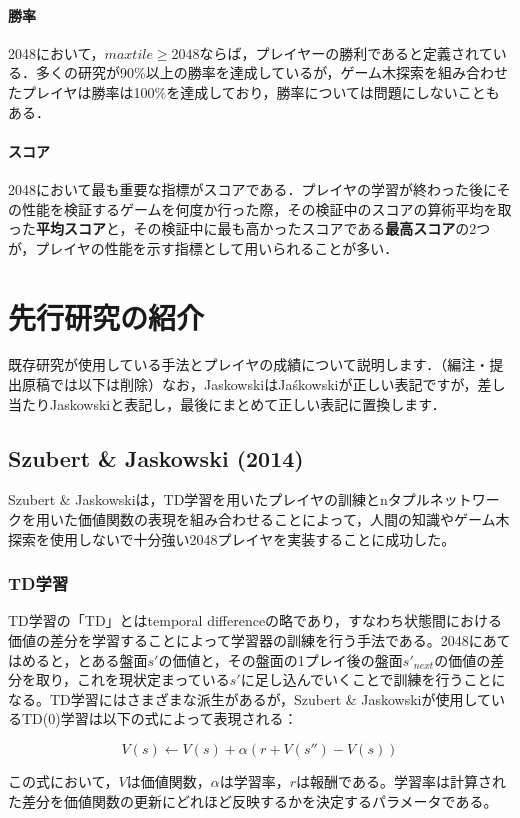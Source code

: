 \documentclass{suribt}
\begin{document}
\subsubsection{勝率}
2048において，$max tile \geq 2048$ならば，プレイヤーの勝利であると定義されている．多くの研究が90\%以上の勝率を達成しているが，ゲーム木探索を組み合わせたプレイヤは勝率は100\%を達成しており，勝率については問題にしないこともある．

\subsubsection{スコア}
2048において最も重要な指標がスコアである．プレイヤの学習が終わった後にその性能を検証するゲームを何度か行った際，その検証中のスコアの算術平均を取った\textbf{平均スコア}と，その検証中に最も高かったスコアである\textbf{最高スコア}の2つが，プレイヤの性能を示す指標として用いられることが多い．

\chapter{先行研究の紹介}
既存研究が使用している手法とプレイヤの成績について説明します．（編注・提出原稿では以下は削除）なお，JaskowskiはJa\'{s}kowskiが正しい表記ですが，差し当たりJaskowskiと表記し，最後にまとめて正しい表記に置換します．

\section{Szubert \& Jaskowski (2014)}
Szubert \& Jaskowskiは，TD学習を用いたプレイヤの訓練とnタプルネットワークを用いた価値関数の表現を組み合わせることによって，人間の知識やゲーム木探索を使用しないで十分強い2048プレイヤを実装することに成功した。
\subsection{TD学習}
TD学習の「TD」とはtemporal differenceの略であり，すなわち状態間における価値の差分を学習することによって学習器の訓練を行う手法である。2048にあてはめると，とある盤面$s'$の価値と，その盤面の1プレイ後の盤面$s'_{next}$の価値の差分を取り，これを現状定まっている$s'$に足し込んでいくことで訓練を行うことになる。TD学習にはさまざまな派生があるが，Szubert \& Jaskowskiが使用しているTD(0)学習は以下の式によって表現される：

\[
	V(s) ← V(s) + \alpha (r + V(s'') - V(s) )
\]

この式において，$V$は価値関数，$\alpha$は学習率，$r$は報酬である。学習率は計算された差分を価値関数の更新にどれほど反映するかを決定するパラメータである。
\end{document}
